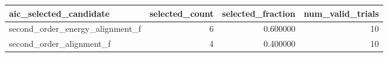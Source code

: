 \begin{tabular}{lrrr}
\toprule
aic_selected_candidate & selected_count & selected_fraction & num_valid_trials \\
\midrule
second_order_energy_alignment_f & 6 & 0.600000 & 10 \\
second_order_alignment_f & 4 & 0.400000 & 10 \\
\bottomrule
\end{tabular}
